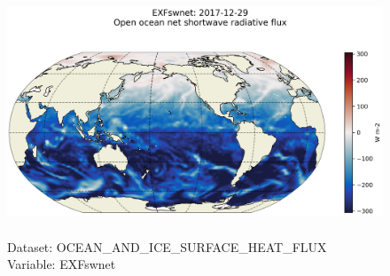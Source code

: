 \begin{figure}[H]
\centering
\includegraphics[scale=0.5]{../images/plots/latlon_plots/Ocean_and_Sea-Ice_Surface_Heat_Fluxes/EXFswnet.png}
\caption{\\Dataset: OCEAN\_AND\_ICE\_SURFACE\_HEAT\_FLUX\\Variable: EXFswnet}
\label{tab:table-OCEAN_AND_ICE_SURFACE_HEAT_FLUX_EXFswnet-Plot}
\end{figure}
\pagebreak
